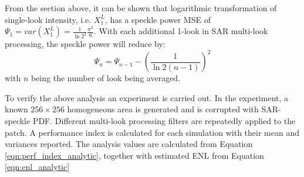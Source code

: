 From the section above, it can be shown that logarithmic transformation of single-look intensity, i.e. $X^L_1$, has a speckle power MSE of $\Psi_1 = var(X^L_1)=\frac{1}{\ln2^2} \frac{\pi^2}{6}$. 
With each additional 1-look in SAR multi-look processing, the speckle power will reduce by:  
\begin{equation}
 \Psi_n = \Psi_{n-1} - \left( \frac{1}{\ln2(n-1)} \right)^2 
\end{equation}
with $n$ being the number of look being averaged. 

To verify the above analysis an experiment is carried out.
In the experiment, a known $256\times256$ homogeneous area is generated and is corrupted with SAR-speckle PDF. 
Different multi-look processing filters are repeatedly applied to the patch. 
A performance index is calculated for each simulation with their mean and variances reported. 
The analysis values are calculated from Equation \ref{eqn:perf_index_analytic}, together with estimated ENL from Equation \ref{eqn:enl_analytic}


